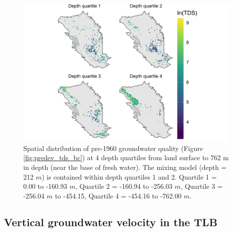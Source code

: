 \begin{figure}[H]
	\includegraphics[width=\textwidth]{ch3_appendix_figs/predev_tds_map.pdf}
	\caption{Spatial distribution of pre-1960 groundwater quality (Figure \ref{fig:predev_tds_bc}) at 4 depth quartiles from land surface to 762 m in depth (near the base of fresh water). The mixing model (depth = 212 $m$) is contained within depth quartiles 1 and 2. Quartile 1 = 0.00 to -160.93 $m$, Quartile 2 = -160.94 to -256.03  $m$, Quartile 3 = -256.04 $m$ to -454.15, Quartile 4 = -454.16 to -762.00 $m$.}
	\label{ap_b_predev_tds_map}
\end{figure}


\subsection{Vertical groundwater velocity in the TLB}




\bgroup

\renewcommand{\arraystretch}{1.5}

\setlength{\tabcolsep}{20pt}

